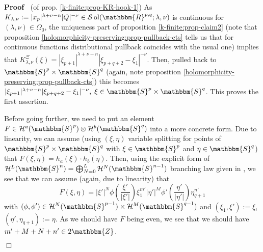 \documentclass{article}
\newcommand{\assign}{:=}
\newcommand{\comma}{{,}}
\newcommand{\tmop}[1]{\ensuremath{\operatorname{#1}}}
\newenvironment{proof}{\noindent\textbf{Proof\ }}{\hspace*{\fill}$\Box$\medskip}
\begin{document}
\begin{proof}
  (of prop. \ref{k-finite:prop-KR-hook-1}) As $K_{\lambda, \nu} \assign | x_p
  |^{\lambda + \nu - n} | Q |^{- \nu} \in \mathcal{S} \tmop{ol}
  (\mathbbm{R}^{p, q} ; \lambda, \nu)$ is continuous for $(\lambda, \nu) \in
  \Omega_0$, the uniqueness part of proposition \ref{k-finite:prop-claim2}
  (note that proposition \ref{holomorphicity-preserving:prop-pullback-cts}
  tells us that for continuous functions distributional pullback coincides
  with the usual one) implies that $K_{\lambda, \nu}^{\Xi} (\xi) = | \xi_{p +
  1} |^{\lambda + \nu - n} | \xi_{p + q + 2} - \xi_1 |^{- \nu}$. Then, pulled
  back to $\mathbbm{S}^p \times \mathbbm{S}^q$ (again, note proposition
  \ref{holomorphicity-preserving:prop-pullback-cts}) this becomes $| \xi_{p +
  1} |^{\lambda + \nu - n} | \xi_{p + q + 2} - \xi_1 |^{- \nu}, \; \xi \in
  \mathbbm{S}^p \times \mathbbm{S}^q$. This proves the first assertion.
  
  Before going further, we need to put an element $F \in \mathcal{H}^a
  (\mathbbm{S}^p) \otimes \mathcal{H}^b (\mathbbm{S}^q)$ into a more concrete
  form. Due to linearity, we can assume (using $(\xi, \eta)$ variable
  splitting for points of $\mathbbm{S}^p \times \mathbbm{S}^q$ with $\xi \in
  \mathbbm{S}^p$ and $\eta \in \mathbbm{S}^q$) that $F (\xi \comma \eta) = h_a
  (\xi) \cdot h_b (\eta)$. Then, using the explicit form of $\mathcal{H}^L
  (\mathbbm{S}^n) = \bigoplus_{N = 0}^L \mathcal{H}^N (\mathbbm{S}^{n - 1})$
  branching law given in {\cite[sec 4.2]{kobayashi2015symmetry}}, we see that
  we can assume (again, due to linearity) that
  \[ F (\xi, \eta) = | \xi' |^N \phi \left( \frac{\xi'}{| \xi' |} \right)
     \xi_1^{m'} | \eta' |^M \phi' \left( \frac{\eta'}{| \eta' |} \right)
     \eta_{q + 1}^{n'} \]
  with $(\phi, \phi') \in \mathcal{H}^N (\mathbbm{S}^{p - 1}) \times
  \mathcal{H}^M (\mathbbm{S}^{q - 1})$ and $(\xi_1, \xi') \assign \xi$,
  $(\eta', \eta_{q + 1}) \assign \eta$. As we should have $F$ being even, we
  see that we should have $m' + M + N + n' \in 2\mathbbm{Z}$.
  

\end{proof}
\end{document}
